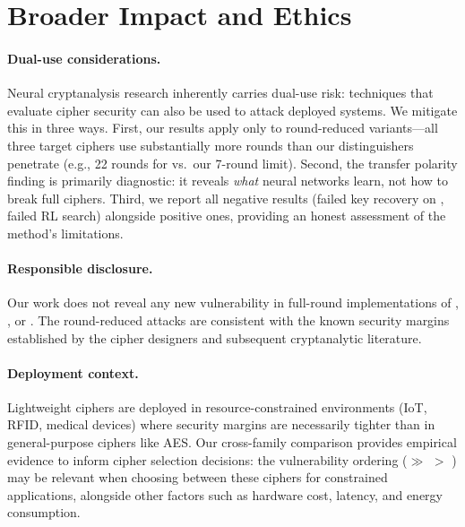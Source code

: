 \section{Broader Impact and Ethics}
\label{sec:app-ethics}

\paragraph{Dual-use considerations.}
Neural cryptanalysis research inherently carries dual-use risk: techniques that evaluate cipher security can also be used to attack deployed systems.
We mitigate this in three ways.
First, our results apply only to round-reduced variants---all three target ciphers use substantially more rounds than our distinguishers penetrate (e.g., 22 rounds for \speck vs.\ our 7-round limit).
Second, the transfer polarity finding is primarily diagnostic: it reveals \emph{what} neural networks learn, not how to break full ciphers.
Third, we report all negative results (failed key recovery on \simon, failed RL search) alongside positive ones, providing an honest assessment of the method's limitations.

\paragraph{Responsible disclosure.}
Our work does not reveal any new vulnerability in full-round implementations of \speck, \simon, or \present.
The round-reduced attacks are consistent with the known security margins established by the cipher designers and subsequent cryptanalytic literature.

\paragraph{Deployment context.}
Lightweight ciphers are deployed in resource-constrained environments (IoT, RFID, medical devices) where security margins are necessarily tighter than in general-purpose ciphers like AES.
Our cross-family comparison provides empirical evidence to inform cipher selection decisions: the vulnerability ordering (\simon $\gg$ \speck $>$ \present) may be relevant when choosing between these ciphers for constrained applications, alongside other factors such as hardware cost, latency, and energy consumption.
